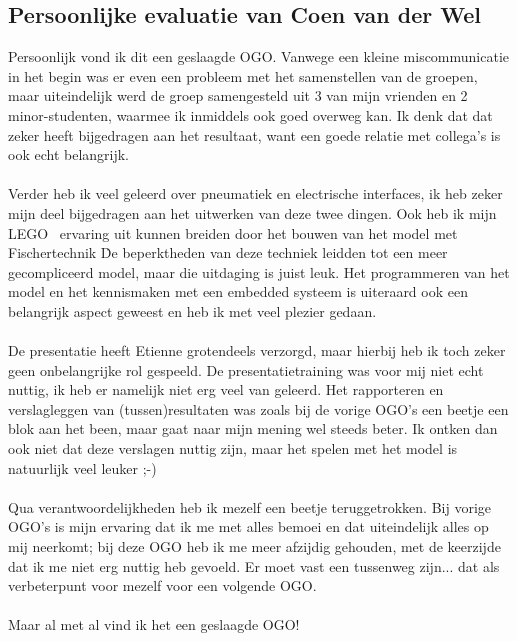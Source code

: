 \subsection{Persoonlijke evaluatie van Coen van der Wel}

    Persoonlijk vond ik dit een geslaagde OGO. Vanwege een kleine
    miscommunicatie in het begin was er even een probleem met het
    samenstellen van de groepen, maar uiteindelijk werd de groep
    samengesteld uit 3 van mijn vrienden en 2 minor-studenten, waarmee
    ik inmiddels ook goed overweg kan. Ik denk dat dat zeker heeft
    bijgedragen aan het resultaat, want een goede relatie met collega's
    is ook echt belangrijk.\\
    \\
    Verder heb ik veel geleerd over pneumatiek en electrische
    interfaces, ik heb zeker mijn deel bijgedragen aan het uitwerken van
    deze twee dingen. Ook heb ik mijn LEGO \texttrademark \ ervaring uit kunnen
    breiden door het bouwen van het model met Fischertechnik \texttrademark \. De
    beperktheden van deze techniek leidden tot een meer gecompliceerd
    model, maar die uitdaging is juist leuk. Het programmeren van het
    model en het kennismaken met een embedded systeem is uiteraard ook
    een belangrijk aspect geweest en heb ik met veel plezier gedaan.\\
    \\
    De presentatie heeft Etienne grotendeels verzorgd, maar hierbij heb
    ik toch zeker geen onbelangrijke rol gespeeld. De
    presentatietraining was voor mij niet echt nuttig, ik heb er namelijk
    niet erg veel van geleerd. Het rapporteren en verslagleggen van
    (tussen)resultaten was zoals bij de vorige OGO's een beetje een blok
    aan het been, maar gaat naar mijn mening wel steeds beter. Ik ontken
    dan ook niet dat deze verslagen nuttig zijn, maar het spelen met het
    model is natuurlijk veel leuker ;-)\\
    \\
    Qua verantwoordelijkheden heb ik mezelf een beetje teruggetrokken. Bij
    vorige OGO's is mijn ervaring dat ik me met alles bemoei en dat uiteindelijk
    alles op mij neerkomt; bij deze OGO heb ik me meer afzijdig gehouden, met de
    keerzijde dat ik me niet erg nuttig heb gevoeld. Er moet vast een tussenweg
    zijn... dat als verbeterpunt voor mezelf voor een volgende OGO.\\
    \\
    Maar al met al vind ik het een geslaagde OGO!
